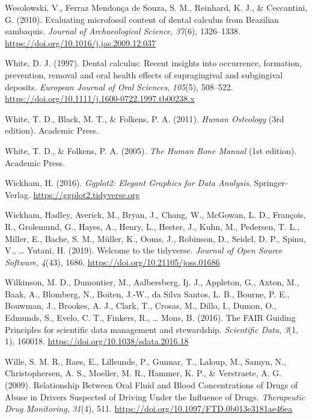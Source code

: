\documentclass[
  letterpaper,
]{book}
\newlength{\cslhangindent}
\newlength{\cslentryspacingunit} %
\newenvironment{CSLReferences}[2] %
 {%
  \setlength{\parindent}{0pt}
  \ifodd #1
  \let\oldpar\par
  \def\par{\hangindent=\cslhangindent\oldpar}
  \fi
  \setlength{\parskip}{#2\cslentryspacingunit}
 }%
 {}
\begin{document}
\begin{CSLReferences}{1}{0}
\leavevmode{}%
Wesolowski, V., Ferraz Mendonça de Souza, S. M., Reinhard, K. J., \&
Ceccantini, G. (2010). Evaluating microfossil content of dental calculus
from {Brazilian} sambaquis. \emph{Journal of Archaeological Science},
\emph{37}(6), 1326--1338.
\url{https://doi.org/10.1016/j.jas.2009.12.037}

\leavevmode{}%
White, D. J. (1997). Dental calculus: Recent insights into occurrence,
formation, prevention, removal and oral health effects of supragingival
and subgingival deposits. \emph{European Journal of Oral Sciences},
\emph{105}(5), 508--522.
\url{https://doi.org/10.1111/j.1600-0722.1997.tb00238.x}

\leavevmode{}%
White, T. D., Black, M. T., \& Folkens, P. A. (2011). \emph{Human
{Osteology}} (3rd edition). {Academic Press}.

\leavevmode{}%
White, T. D., \& Folkens, P. A. (2005). \emph{The {Human Bone Manual}}
(1st edition). {Academic Press}.

\leavevmode{}%
Wickham, H. (2016). \emph{Ggplot2: {Elegant Graphics} for {Data
Analysis}}. {Springer-Verlag}. \url{https://ggplot2.tidyverse.org}

\leavevmode{}%
Wickham, Hadley, Averick, M., Bryan, J., Chang, W., McGowan, L. D.,
François, R., Grolemund, G., Hayes, A., Henry, L., Hester, J., Kuhn, M.,
Pedersen, T. L., Miller, E., Bache, S. M., Müller, K., Ooms, J.,
Robinson, D., Seidel, D. P., Spinu, V., \ldots{} Yutani, H. (2019).
Welcome to the {tidyverse}. \emph{Journal of Open Source Software},
\emph{4}(43), 1686. \url{https://doi.org/10.21105/joss.01686}

\leavevmode{}%
Wilkinson, M. D., Dumontier, M., Aalbersberg, Ij. J., Appleton, G.,
Axton, M., Baak, A., Blomberg, N., Boiten, J.-W., da Silva Santos, L.
B., Bourne, P. E., Bouwman, J., Brookes, A. J., Clark, T., Crosas, M.,
Dillo, I., Dumon, O., Edmunds, S., Evelo, C. T., Finkers, R., \ldots{}
Mons, B. (2016). The {FAIR Guiding Principles} for scientific data
management and stewardship. \emph{Scientific Data}, \emph{3}(1, 1),
160018. \url{https://doi.org/10.1038/sdata.2016.18}

\leavevmode{}%
Wille, S. M. R., Raes, E., Lillsunde, P., Gunnar, T., Laloup, M., Samyn,
N., Christophersen, A. S., Moeller, M. R., Hammer, K. P., \& Verstraete,
A. G. (2009). Relationship {Between Oral Fluid} and {Blood
Concentrations} of {Drugs} of {Abuse} in {Drivers Suspected} of {Driving
Under} the {Influence} of {Drugs}. \emph{Therapeutic Drug Monitoring},
\emph{31}(4), 511. \url{https://doi.org/10.1097/FTD.0b013e3181ae46ea}


\end{CSLReferences}
\end{document}
